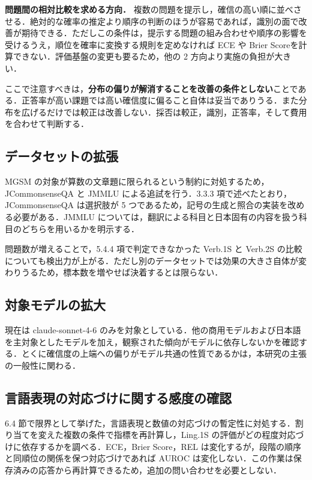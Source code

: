 \textbf{問題間の相対比較を求める方向．} 複数の問題を提示し，確信の高い順に並べさせる．絶対的な確率の推定より順序の判断のほうが容易であれば，識別の面で改善が期待できる．ただしこの条件は，提示する問題の組み合わせや順序の影響を受けるうえ，順位を確率に変換する規則を定めなければ ECE や Brier Scoreを計算できない．評価基盤の変更も要るため，他の 2 方向より実施の負担が大きい．

ここで注意すべきは，\textbf{分布の偏りが解消することを改善の条件としない}ことである．正答率が高い課題では高い確信度に偏ること自体は妥当でありうる．また分布を広げるだけでは較正は改善しない．採否は較正，識別，正答率，そして費用を合わせて判断する．

\subsection{データセットの拡張}

MGSM の対象が算数の文章題に限られるという制約に対処するため，JCommonsenseQA と JMMLU による追試を行う．3.3.3 項で述べたとおり，JCommonsenseQA は選択肢が 5 つであるため，記号の生成と照合の実装を改める必要がある．JMMLU については，翻訳による科目と日本固有の内容を扱う科目のどちらを用いるかを明示する．

問題数が増えることで，5.4.4 項で判定できなかった Verb.1S と Verb.2S の比較についても検出力が上がる．ただし別のデータセットでは効果の大きさ自体が変わりうるため，標本数を増やせば決着するとは限らない．

\subsection{対象モデルの拡大}

現在は claude-sonnet-4-6 のみを対象としている．他の商用モデルおよび日本語を主対象としたモデルを加え，観察された傾向がモデルに依存しないかを確認する．とくに確信度の上端への偏りがモデル共通の性質であるかは，本研究の主張の一般性に関わる．

\subsection{言語表現の対応づけに関する感度の確認}

6.4 節で限界として挙げた，言語表現と数値の対応づけの暫定性に対処する．割り当てを変えた複数の条件で指標を再計算し，Ling.1S の評価がどの程度対応づけに依存するかを調べる．ECE，Brier Score，REL は変化するが，段階の順序と同順位の関係を保つ対応づけであれば AUROC は変化しない．この作業は保存済みの応答から再計算できるため，追加の問い合わせを必要としない．

